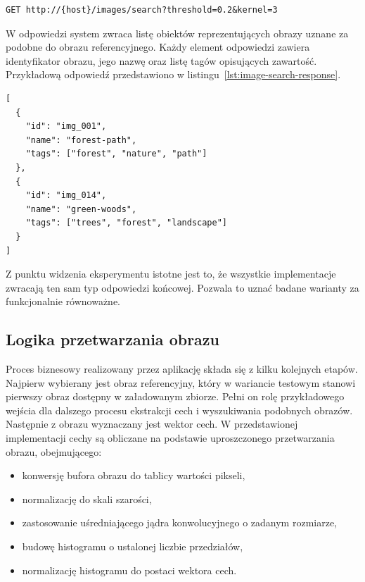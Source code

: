 \begin{listing}[H]
    \begin{verbatim}
GET http://{host}/images/search?threshold=0.2&kernel=3
    \end{verbatim}
    \caption{Przykładowe wywołanie punktu końcowego HTTP}
    \label{lst:image-search-http}
\end{listing}

W odpowiedzi system zwraca listę obiektów reprezentujących obrazy uznane za podobne do obrazu referencyjnego. Każdy element odpowiedzi zawiera identyfikator obrazu, jego nazwę oraz listę tagów opisujących zawartość. Przykładową odpowiedź przedstawiono w listingu~\ref{lst:image-search-response}.

\begin{listing}[H]
    \begin{verbatim}
[
  {
    "id": "img_001",
    "name": "forest-path",
    "tags": ["forest", "nature", "path"]
  },
  {
    "id": "img_014",
    "name": "green-woods",
    "tags": ["trees", "forest", "landscape"]
  }
]
    \end{verbatim}
    \caption{Przykładowa odpowiedź systemu}
    \label{lst:image-search-response}
\end{listing}

Z punktu widzenia eksperymentu istotne jest to, że wszystkie implementacje zwracają ten sam typ odpowiedzi końcowej. Pozwala to uznać badane warianty za funkcjonalnie równoważne.

\subsection{Logika przetwarzania obrazu}

Proces biznesowy realizowany przez aplikację składa się z kilku kolejnych etapów. Najpierw wybierany jest obraz referencyjny, który w wariancie testowym stanowi pierwszy obraz dostępny w załadowanym zbiorze. Pełni on rolę przykładowego wejścia dla dalszego procesu ekstrakcji cech i wyszukiwania podobnych obrazów. Następnie z obrazu wyznaczany jest wektor cech. W przedstawionej implementacji cechy są obliczane na podstawie uproszczonego przetwarzania obrazu, obejmującego:
\begin{itemize}
    \item konwersję bufora obrazu do tablicy wartości pikseli,
    \item normalizację do skali szarości,
    \item zastosowanie uśredniającego jądra konwolucyjnego o zadanym rozmiarze,
    \item budowę histogramu o ustalonej liczbie przedziałów,
    \item normalizację histogramu do postaci wektora cech.
\end{itemize}

